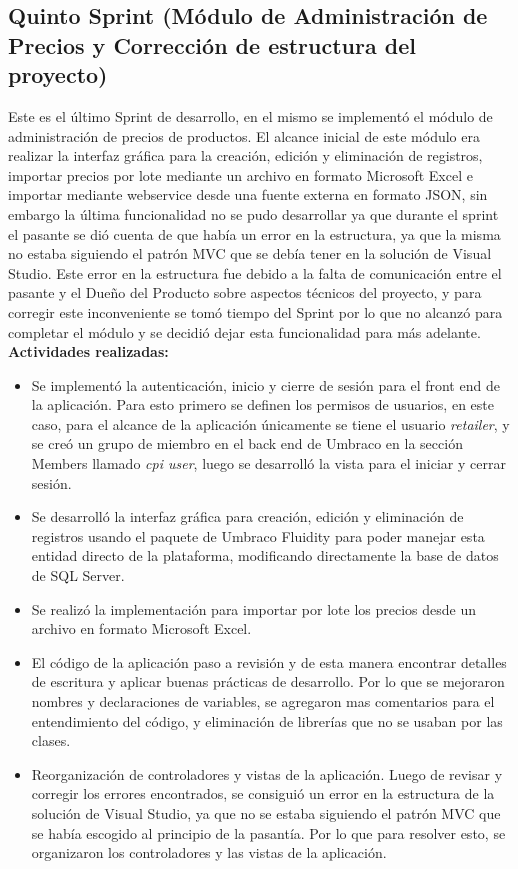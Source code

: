 \subsection{Quinto Sprint (Módulo de Administración de Precios y Corrección de estructura del proyecto)} 
Este es el último Sprint de desarrollo, en el mismo se implementó el módulo de administración de precios de productos. El alcance inicial de este módulo era realizar la interfaz gráfica para la creación, edición y eliminación de registros, importar precios por lote mediante un archivo en formato Microsoft Excel e importar mediante webservice desde una fuente externa en formato JSON, sin embargo la última funcionalidad no se pudo desarrollar ya que durante el sprint el pasante se dió cuenta de que había un error en la estructura, ya que la misma no estaba siguiendo el patrón MVC que se debía tener en la solución de Visual Studio. Este error en la estructura fue debido a la falta de comunicación entre el pasante y el Dueño del Producto sobre aspectos técnicos del proyecto, y para corregir este inconveniente se tomó tiempo del Sprint por lo que no alcanzó para completar el módulo y se decidió dejar esta funcionalidad para más adelante.
\vskip 0.5cm
\textbf{Actividades realizadas:}
\begin{itemize} 
   \item Se implementó la autenticación, inicio y cierre de sesión para el front end de la aplicación. Para esto primero se definen los permisos de usuarios, en este caso, para el alcance de la aplicación únicamente se tiene el usuario \emph{retailer}, y se creó un grupo de miembro en el back end de Umbraco en la sección Members llamado \emph{cpi user}, luego se desarrolló la vista para el iniciar y cerrar sesión.
   \item Se desarrolló la interfaz gráfica para creación, edición y eliminación de registros usando el paquete de Umbraco Fluidity para poder manejar esta entidad directo de la plataforma, modificando directamente la base de datos de SQL Server.
   \item Se realizó la implementación para importar por lote los precios desde un archivo en formato Microsoft Excel.
   \item El código de la aplicación paso a revisión y de esta manera encontrar detalles de escritura y aplicar buenas prácticas de desarrollo. Por lo que se mejoraron nombres y declaraciones de variables, se agregaron mas comentarios para el entendimiento del código, y eliminación de librerías que no se usaban por las clases.
   \item Reorganización de controladores y vistas de la aplicación. Luego de revisar y corregir los errores encontrados, se consiguió un error en la estructura de la solución de Visual Studio, ya que no se estaba siguiendo el patrón MVC que se había escogido al principio de la pasantía. Por lo que para resolver esto, se organizaron los controladores y las vistas de la aplicación.
\end{itemize}


